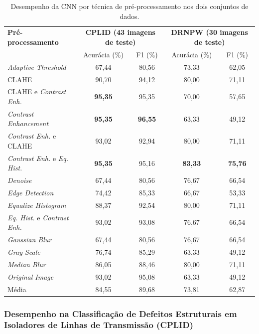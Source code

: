 \begin{table}[H]
    \centering
    \caption{\label{tab:cnn_resultados}Desempenho da CNN por técnica de pré-processamento nos dois conjuntos de dados.}
    \vspace{0.2cm}
    \small
    \begin{tabular}{lcccc}
        \hline
        \textbf{Pré-processamento} & \multicolumn{2}{c}{\textbf{CPLID (43 imagens de teste)}} & \multicolumn{2}{c}{\textbf{DRNPW (30 imagens de teste)}} \\
        & Acurácia (\%) & F1 (\%) & Acurácia (\%) & F1 (\%) \\
        \hline
        \textit{Adaptive Threshold} & 67,44 & 80,56 & 73,33 & 62,05 \\
        CLAHE & 90,70 & 94,12 & 80,00 & 71,11 \\
        CLAHE e \textit{Contrast Enh.} & \textbf{95,35} & 95,35 & 70,00 & 57,65 \\
        \textit{Contrast Enhancement} & \textbf{95,35} & \textbf{96,55} & 63,33 & 49,12 \\
        \textit{Contrast Enh.} e CLAHE & 93,02 & 92,94 & 80,00 & 71,11 \\
        \textit{Contrast Enh.} e \textit{Eq. Hist.} & \textbf{95,35} & 95,16 & \textbf{83,33} & \textbf{75,76} \\
        \textit{Denoise} & 67,44 & 80,56 & 76,67 & 66,54 \\
        \textit{Edge Detection} & 74,42 & 85,33 & 66,67 & 53,33 \\
        \textit{Equalize Histogram} & 88,37 & 92,54 & 80,00 & 71,11 \\
        \textit{Eq. Hist.} e \textit{Contrast Enh.} & 93,02 & 93,08 & 76,67 & 66,54 \\
        \textit{Gaussian Blur} & 67,44 & 80,56 & 76,67 & 66,54 \\
        \textit{Gray Scale} & 76,74 & 85,29 & 63,33 & 49,12 \\
        \textit{Median Blur} & 86,05 & 88,46 & 80,00 & 71,11 \\
        \textit{Original Image} & 93,02 & 95,08 & 63,33 & 49,12 \\
        \hline
        Média & 84,55 & 89,68 & 73,81 & 62,87 \\
        \hline
    \end{tabular}
\end{table}

\subsubsection{Desempenho na Classificação de Defeitos Estruturais em Isoladores de Linhas de Transmissão (CPLID)}

